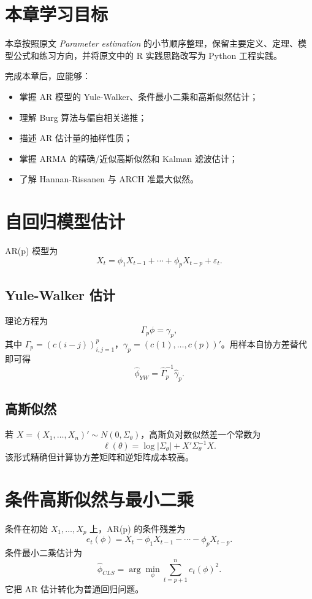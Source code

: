 \documentclass[11pt,a4paper,openany]{ctexbook}
\begin{document}
\section*{本章学习目标}

本章按照原文 \textit{Parameter estimation} 的小节顺序整理，保留主要定义、定理、模型公式和练习方向，并将原文中的 R 实践思路改写为 Python 工程实践。

完成本章后，应能够：
\begin{itemize}
  \item 掌握 AR 模型的 Yule-Walker、条件最小二乘和高斯似然估计；
  \item 理解 Burg 算法与偏自相关递推；
  \item 描述 AR 估计量的抽样性质；
  \item 掌握 ARMA 的精确/近似高斯似然和 Kalman 滤波估计；
  \item 了解 Hannan-Rissanen 与 ARCH 准最大似然。
\end{itemize}

\section{自回归模型估计}

AR(p) 模型为
\[
  X_t=\phi_1X_{t-1}+\cdots+\phi_pX_{t-p}+\varepsilon_t.
\]
\subsection{Yule-Walker 估计}

理论方程为
\[
  \Gamma_p\phi=\gamma_p,
\]
其中 \(\Gamma_p=(c(i-j))_{i,j=1}^p\)，\(\gamma_p=(c(1),\ldots,c(p))'\)。用样本自协方差替代即可得
\[
  \hat\phi_{YW}=\hat\Gamma_p^{-1}\hat\gamma_p.
\]

\subsection{高斯似然}

若 \(X=(X_1,\ldots,X_n)'\sim N(0,\Sigma_\theta)\)，高斯负对数似然差一个常数为
\[
  \ell(\theta)=\log|\Sigma_\theta|+X'\Sigma_\theta^{-1}X.
\]
该形式精确但计算协方差矩阵和逆矩阵成本较高。

\section{条件高斯似然与最小二乘}

条件在初始 \(X_1,\ldots,X_p\) 上，AR(p) 的条件残差为
\[
  e_t(\phi)=X_t-\phi_1X_{t-1}-\cdots-\phi_pX_{t-p}.
\]
条件最小二乘估计为
\[
  \hat\phi_{CLS}
  =\arg\min_\phi\sum_{t=p+1}^n e_t(\phi)^2.
\]
它把 AR 估计转化为普通回归问题。
\end{document}

